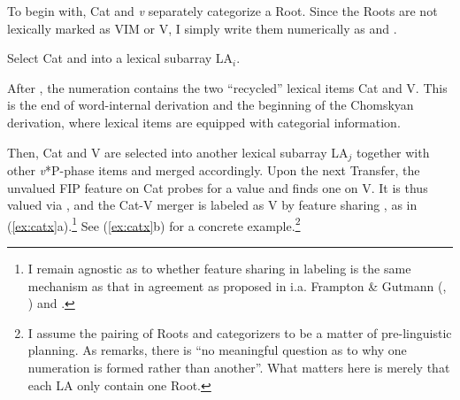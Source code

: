 \documentclass[output=paper]{langsci/langscibook}
\begin{document}
To begin with, Cat and {\em v} separately categorize a Root. Since the Roots
are not lexically marked as \gls{VIM} or V, I simply write them numerically as
{} and {}.

\ea\label{ex:catv}
\ea
{Select Cat and {} into a lexical subarray LA$_i$.}
\z
\z

\noindent After , the numeration contains the two ``recycled''
lexical items Cat\textsubscript{\textsurd} and V\textsubscript{\textsurd}. This
is the end of word-internal derivation and the beginning of the Chomskyan
derivation, where lexical items are equipped with categorial information.

Then, Cat\textsubscript{\textsurd} and V\textsubscript{\textsurd} are selected
into another lexical subarray LA$_j$ together with other {\em v}*P-phase items
and merged accordingly. Upon the next Transfer, the unvalued \gls{FIP} feature on Cat
probes for a value and finds one on V. It is thus valued via , and the
Cat\textsubscript{\textsurd}-V\textsubscript{\textsurd} merger is labeled as V
by feature sharing \citep{Chomsky2013}, as in (\ref{ex:catx}a).\footnote{I
remain agnostic as to whether feature sharing in labeling is the same mechanism
as that in agreement as proposed in i.a. Frampton {\&} Gutmann
(\citeyear{FramptonGutmann2000}, \citeyear{FramptonGutmann2006}) and
\citet{HaugNikitina2016}.} See (\ref{ex:catx}b) for a concrete
example.\footnote{I assume the pairing of Roots and categorizers to be a matter
of pre-linguistic planning. As \citet[227]{Chomsky1995} remarks, there is ``no
meaningful question as to why one numeration is formed rather than another''.
What matters here is merely that each LA only contain one Root.}
\end{document}
